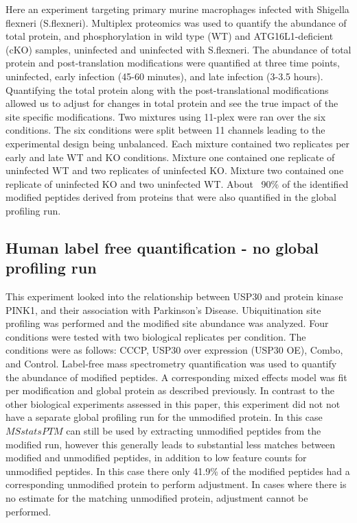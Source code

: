 \documentclass[mcp]{article}
\numberwithin{figure}{section} %
\numberwithin{table}{section}
\begin{document}
Here an experiment targeting primary murine macrophages infected with Shigella flexneri (S.flexneri). \cite{Maculins} Multiplex proteomics was used to quantify the abundance of total protein, and phosphorylation in wild type (WT) and ATG16L1-deficient (cKO) samples, uninfected and uninfected with S.flexneri. The abundance of total protein and post-translation modifications were quantified at three time points, uninfected, early infection (45-60 minutes), and late infection (3-3.5 hours). Quantifying the total protein along with the post-translational modifications allowed us to adjust for changes in total protein and see the true impact of the site specific modifications. Two mixtures using 11-plex were ran over the six conditions. The six conditions were split between 11 channels leading to the experimental design being unbalanced. Each mixture contained two replicates per early and late WT and KO conditions. Mixture one contained one replicate of uninfected WT and two replicates of uninfected KO. Mixture two contained one replicate of uninfected KO and two uninfected WT. About ~90\% of the identified modified peptides derived from proteins that were also quantified in the global profiling run.

\subsection*{Human label free quantification - no global profiling run}

This experiment looked into the relationship between USP30 and protein kinase PINK1, and their association with Parkinson’s Disease. Ubiquitination site profiling was performed and the modified site abundance was analyzed. Four conditions were tested with two biological replicates per condition. The conditions were as follows: CCCP, USP30 over expression (USP30 OE), Combo, and Control. Label-free mass spectrometry quantification was used to quantify the abundance of modified peptides. A corresponding mixed effects model was fit per modification and global protein as described previously. In contrast to the other biological experiments assessed in this paper, this experiment did not not have a separate global profiling run for the unmodified protein. In this case $MSstatsPTM$ can still be used by extracting unmodified peptides from the modified run, however this generally leads to substantial less matches between modified and unmodified peptides, in addition to low feature counts for unmodified peptides. In this case there only 41.9\% of the modified peptides had a corresponding unmodified protein to perform adjustment. In cases where there is no estimate for the matching unmodified protein, adjustment cannot be performed.
\end{document}
